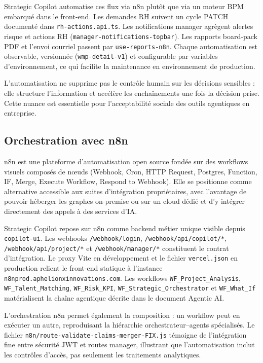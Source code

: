 Strategic Copilot automatise ces flux via n8n plutôt que via un moteur BPM embarqué dans le front-end. Les demandes RH suivent un cycle PATCH documenté dans \texttt{rh-actions.api.ts}. Les notifications manager agrègent alertes risque et actions RH (\texttt{manager-notifications-topbar}). Les rapports board-pack PDF et l'envoi courriel passent par \texttt{use-reports-n8n}. Chaque automatisation est observable, versionnée (\texttt{wmp-detail-v1}) et configurable par variables d'environnement, ce qui facilite la maintenance en environnement de production.

L'automatisation ne supprime pas le contrôle humain sur les décisions sensibles : elle structure l'information et accélère les enchaînements une fois la décision prise. Cette nuance est essentielle pour l'acceptabilité sociale des outils agentiques en entreprise.

\subsection{Orchestration avec n8n}

n8n \cite{n8n2025} est une plateforme d'automatisation open source fondée sur des workflows visuels composés de nœuds (Webhook, Cron, HTTP Request, Postgres, Function, IF, Merge, Execute Workflow, Respond to Webhook). Elle se positionne comme alternative accessible aux suites d'intégration propriétaires, avec l'avantage de pouvoir héberger les graphes on-premise ou sur un cloud dédié et d'y intégrer directement des appels à des services d'IA.

Strategic Copilot repose sur n8n comme backend métier unique visible depuis \texttt{copilot-ui}. Les webhooks \texttt{/webhook/login}, \texttt{/webhook/api/copilot/*}, \texttt{/webhook/api/project/*} et \texttt{/webhook/manager/*} constituent le contrat d'intégration. Le proxy Vite en développement et le fichier \texttt{vercel.json} en production relient le front-end statique à l'instance \texttt{n8nprod.aphelionxinnovations.com}. Les workflows \texttt{WF\_Project\_Analysis}, \texttt{WF\_Talent\_Matching}, \texttt{WF\_Risk\_KPI}, \texttt{WF\_Strategic\_Orchestrator} et \texttt{WF\_What\_If} matérialisent la chaîne agentique décrite dans le document Agentic AI.

L'orchestration n8n permet également la composition : un workflow peut en exécuter un autre, reproduisant la hiérarchie orchestrateur--agents spécialisés. Le fichier \texttt{n8n/route-validate-claims-merger-FIX.js} témoigne de l'intégration fine entre sécurité JWT et routes manager, illustrant que l'automatisation inclut les contrôles d'accès, pas seulement les traitements analytiques.

